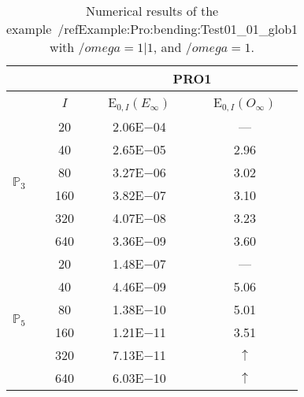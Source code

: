 \begin{table}[H]
\caption{Numerical results of the example~/ref{Example:Pro:bending:Test01_01_glob1} with $/omega=1|1$, and $/omega=1$.}
\setlength{\tabcolsep}{5pt}
\centering
\begin{tabular}{@{}l c c c@{}}
\toprule
 &  & \multicolumn{2}{c}{PRO1}\\
\midrule
 & $I$ & E$_{0,I}(E_{\infty})$ & E$_{0,I}(O_{\infty})$\\
\midrule
\multirow{6}{*}{$\mathbb{P}_{3}$}
 & 20 & 2.06E$-$04 & ---\\
 & 40 & 2.65E$-$05 & 2.96\\
 & 80 & 3.27E$-$06 & 3.02\\
 & 160 & 3.82E$-$07 & 3.10\\
 & 320 & 4.07E$-$08 & 3.23\\
 & 640 & 3.36E$-$09 & 3.60\\
\midrule
\multirow{6}{*}{$\mathbb{P}_{5}$}
 & 20 & 1.48E$-$07 & ---\\
 & 40 & 4.46E$-$09 & 5.06\\
 & 80 & 1.38E$-$10 & 5.01\\
 & 160 & 1.21E$-$11 & 3.51\\
 & 320 & 7.13E$-$11 & $\uparrow$\\
 & 640 & 6.03E$-$10 & $\uparrow$\\
\bottomrule
\end{tabular}
\label{Table:PRO:test_01_01_test4_pro1}
\end{table}
